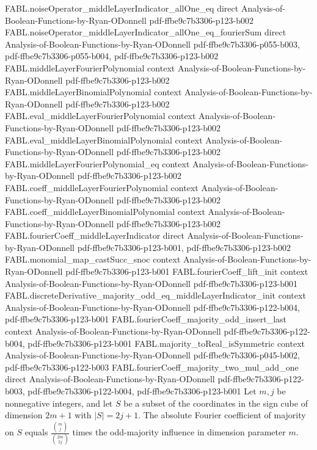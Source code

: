 \begin{theorem}
  {FABL.noiseOperator_middleLayerIndicator_allOne_eq}
  {direct}
  {Analysis-of-Boolean-Functions-by-Ryan-ODonnell}
  {pdf-ffbe9c7b3306-p123-b002}
\proofstep
  {FABL.noiseOperator_middleLayerIndicator_allOne_eq_fourierSum}
  {direct}
  {Analysis-of-Boolean-Functions-by-Ryan-ODonnell}
  {pdf-ffbe9c7b3306-p055-b003,
    pdf-ffbe9c7b3306-p055-b004,
    pdf-ffbe9c7b3306-p123-b002}
\proofstep
  {FABL.middleLayerFourierPolynomial}
  {context}
  {Analysis-of-Boolean-Functions-by-Ryan-ODonnell}
  {pdf-ffbe9c7b3306-p123-b002}
\proofstep
  {FABL.middleLayerBinomialPolynomial}
  {context}
  {Analysis-of-Boolean-Functions-by-Ryan-ODonnell}
  {pdf-ffbe9c7b3306-p123-b002}
\proofstep
  {FABL.eval_middleLayerFourierPolynomial}
  {context}
  {Analysis-of-Boolean-Functions-by-Ryan-ODonnell}
  {pdf-ffbe9c7b3306-p123-b002}
\proofstep
  {FABL.eval_middleLayerBinomialPolynomial}
  {context}
  {Analysis-of-Boolean-Functions-by-Ryan-ODonnell}
  {pdf-ffbe9c7b3306-p123-b002}
\proofstep
  {FABL.middleLayerFourierPolynomial_eq}
  {context}
  {Analysis-of-Boolean-Functions-by-Ryan-ODonnell}
  {pdf-ffbe9c7b3306-p123-b002}
\proofstep
  {FABL.coeff_middleLayerFourierPolynomial}
  {context}
  {Analysis-of-Boolean-Functions-by-Ryan-ODonnell}
  {pdf-ffbe9c7b3306-p123-b002}
\proofstep
  {FABL.coeff_middleLayerBinomialPolynomial}
  {context}
  {Analysis-of-Boolean-Functions-by-Ryan-ODonnell}
  {pdf-ffbe9c7b3306-p123-b002}
\proofstep
  {FABL.fourierCoeff_middleLayerIndicator}
  {direct}
  {Analysis-of-Boolean-Functions-by-Ryan-ODonnell}
  {pdf-ffbe9c7b3306-p123-b001,
    pdf-ffbe9c7b3306-p123-b002}
\proofstep
  {FABL.monomial_map_castSucc_snoc}
  {context}
  {Analysis-of-Boolean-Functions-by-Ryan-ODonnell}
  {pdf-ffbe9c7b3306-p123-b001}
\proofstep
  {FABL.fourierCoeff_lift_init}
  {context}
  {Analysis-of-Boolean-Functions-by-Ryan-ODonnell}
  {pdf-ffbe9c7b3306-p123-b001}
\proofstep
  {FABL.discreteDerivative_majority_odd_eq_middleLayerIndicator_init}
  {context}
  {Analysis-of-Boolean-Functions-by-Ryan-ODonnell}
  {pdf-ffbe9c7b3306-p122-b004,
    pdf-ffbe9c7b3306-p123-b001}
\proofstep
  {FABL.fourierCoeff_majority_odd_insert_last}
  {context}
  {Analysis-of-Boolean-Functions-by-Ryan-ODonnell}
  {pdf-ffbe9c7b3306-p122-b004,
    pdf-ffbe9c7b3306-p123-b001}
\proofstep
  {FABL.majority_toReal_isSymmetric}
  {context}
  {Analysis-of-Boolean-Functions-by-Ryan-ODonnell}
  {pdf-ffbe9c7b3306-p045-b002,
    pdf-ffbe9c7b3306-p122-b003}
\proofstep
  {FABL.fourierCoeff_majority_two_mul_add_one}
  {direct}
  {Analysis-of-Boolean-Functions-by-Ryan-ODonnell}
  {pdf-ffbe9c7b3306-p122-b003,
    pdf-ffbe9c7b3306-p122-b004,
    pdf-ffbe9c7b3306-p123-b001}
Let $m,j$ be nonnegative integers, and let $S$ be a subset of the coordinates in the
sign cube of dimension $2m+1$ with $|S|=2j+1$. The absolute Fourier coefficient of
majority on $S$ equals $\frac{\binom{m}{j}}{\binom{2m}{2j}}$ times the odd-majority
influence in dimension parameter $m$.
\end{theorem}

